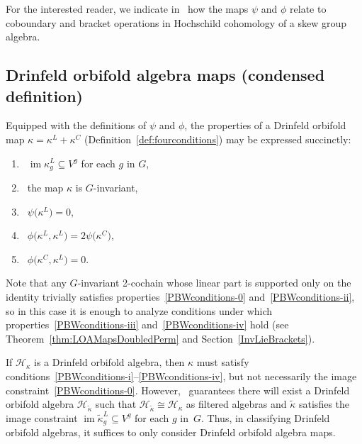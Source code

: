 \documentclass[10pt,a4paper]{amsart}
\numberwithin{equation}{section}
\DeclareMathOperator{\im}{im}
\begin{document}
For the interested reader, we indicate in~\cite{FGK} how the maps $\psi$ and $\phi$ relate to coboundary and bracket operations in Hochschild cohomology of a skew group algebra.

\subsection{Drinfeld orbifold algebra maps (condensed definition)}%

Equipped with the definitions of $\psi$ and $\phi$, the properties of a Drinfeld orbifold map $\kappa=\kappa^L+\kappa^C$
(Definition~\ref{def:fourconditions}) may be expressed succinctly:
\begin{enumerate}	\itemsep=0pt
	\item[\eqref{PBWconditions-0}] \ $\im\kappa^L_g\subseteq V^g$ for each $g$ in $G$,
	\item[\eqref{PBWconditions-i}] \ the map $\kappa$ is $G$-invariant,
	\item[\eqref{PBWconditions-ii}] \ $\psi\big(\kappa^L\big)=0$,
	\item[\eqref{PBWconditions-iii}] \ $\phi\big(\kappa^L,\kappa^L\big)=2\psi\big(\kappa^C\big)$,
	\item[\eqref{PBWconditions-iv}] \ $\phi\big(\kappa^C,\kappa^L\big)=0$.
\end{enumerate}

Note that any $G$-invariant 2-cochain whose linear part is supported only on the identity
trivially satisfies properties~\eqref{PBWconditions-0}
and~\eqref{PBWconditions-ii}, so in this case it is enough to analyze
conditions under which properties~\eqref{PBWconditions-iii} and~\eqref{PBWconditions-iv} hold
(see Theorem~\ref{thm:LOAMapsDoubledPerm} and Section~\ref{InvLieBrackets}).

\begin{Remark}%
	If $\mathcal{H}_{\kappa}$ is a Drinfeld orbifold algebra, then $\kappa$ must satisfy conditions~\eqref{PBWconditions-i}--\eqref{PBWconditions-iv}, but not necessarily the image constraint~\eqref{PBWconditions-0}.
	However,~\cite[Theorem~7.2(ii)]{SWorbifold} guarantees there will exist a
	Drinfeld orbifold algebra $\mathcal{H}_{\widetilde{\kappa}}$ such that
	$\mathcal{H}_{\widetilde{\kappa}}\cong\mathcal{H}_{\kappa}$ as
	filtered algebras and $\widetilde{\kappa}$ satisfies the image constraint
	$\im \widetilde{\kappa}^L_g\subseteq V^g$ for each $g$ in~$G$.
	Thus, in classifying Drinfeld orbifold algebras, it suffices to only
	consider Drinfeld orbifold algebra maps.
\end{Remark}
\end{document}
